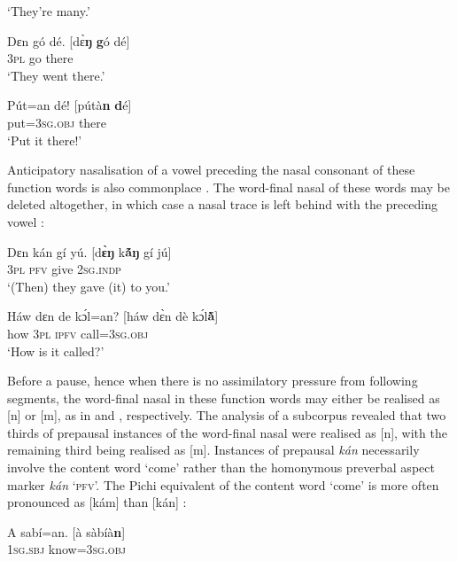 \glt ‘They’re many.’
\z


\ea%
    \label{ex:key:28}
    \gll   Dɛn    gó  dé.            [dɛ̀\textbf{ŋ}    \textbf{g}ó  dé]\\
\textsc{3pl}    go  there\\
\glt ‘They went there.’
\z


\ea%
    \label{ex:key:29}
    \gll   Pút=an    dé!            [pútà\textbf{n}  \textbf{d}é]\\
put=\textsc{3sg.obj}  there\\

\glt ‘Put it there!’
\z

Anticipatory nasalisation of a vowel preceding the nasal consonant of these function words is also commonplace . The word-final nasal of these words may be deleted altogether, in which case a nasal trace is left behind with the preceding vowel :


\ea%
    \label{ex:key:30}
    \gll   Dɛn    kán    gí    yú.      [d\textbf{ɛ̀ŋ}    k\textbf{ã́ŋ}    gí  jú]\\
\textsc{3pl}    \textsc{pfv}    give    \textsc{2sg.indp}\\

\glt ‘(Then) they gave (it) to you.’
\z


\ea%
    \label{ex:key:31}
    \gll   Háw    dɛn  de  kɔ́l=an?        [háw  dɛ̀n  dè  kɔ́l\textbf{ã̀}]\\
how    \textsc{3pl}  \textsc{ipfv}  call=\textsc{3sg.obj}\\

\glt ‘How is it called?’
\z

Before a pause, hence when there is no assimilatory pressure from following segments, the word-final nasal in these function words may either be realised as [n] or [m], as in  and , respectively. The analysis of a subcorpus revealed that two thirds of prepausal instances of the word-final nasal were realised as [n], with the remaining third being realised as [m]. Instances of prepausal \textit{kán} necessarily involve the content word ‘come’ rather than the homonymous preverbal aspect marker \textit{kán} ‘\textsc{pfv}’. The Pichi equivalent of the content word ‘come’ is more often pronounced as [kám] than [kán] :


\ea%
    \label{ex:key:32}
    \gll   A    sabí=an.            [à  sàbíà\textbf{n}]\\
\textsc{1sg.sbj}  know=\textsc{3sg.obj}\\

